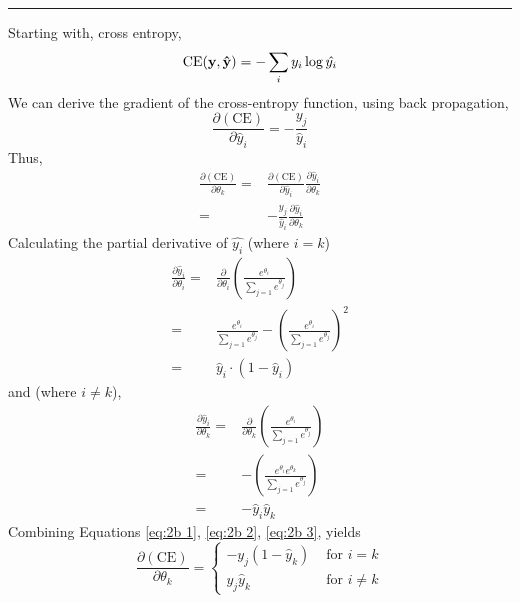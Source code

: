 \documentclass[letter,12pt]{article}
\begin{document}
\noindent\rule{\textwidth}{0.4pt}\vspace{5mm}
Starting with, cross entropy,
\begin{equation}
\textrm{CE}({\bf y},{\bf\hat{y}}) = -\sum_{i}{y_{i}\log{\hat{y_{i}}}}
\end{equation}
We can derive the gradient of the cross-entropy function, using back propagation, 
\begin{equation}
\frac{\partial(\textrm{CE})}{\partial{\hat{y}_{i}}} = -\frac{y_{j}}{\hat{y}_{i}}\label{eq:2b 1}
\end{equation}
Thus, 
\begin{align}
\frac{\partial(\textrm{CE})}{\partial{\theta_{k}}} = & \frac{\partial(\textrm{CE})}{\partial{\hat{y}_{i}}}\frac{\partial{\hat{y}_{i}}}{\partial{\theta_{k}}} \\
                                                                        = & -\frac{y_{j}}{\hat{y}_{i}}\frac{\partial{\hat{y}_{i}}}{\partial{\theta_{k}}}
\end{align}
Calculating the partial derivative of $\hat{y_{i}}$ (where $i=k$)
\begin{align}
\frac{\partial{\hat{y}_{i}}}{\partial{\theta_{i}}} = & \frac{\partial}{\partial{\theta_{i}}}\left( \frac{e^{\theta_{i}}}{\sum_{j=1}{e^{\theta_{j}}}}\right) \\
                                                                      = & \frac{e^{\theta_{i}}}{\sum_{j=1}{e^{\theta_{j}}}} - \left(\frac{e^{\theta_{i}}}{\sum_{j=1}{e^{\theta_{j}}}}\right)^{2} \\
                                                                      = & \hat{y}_{i}\cdot(1 - \hat{y}_{i})\label{eq:2b 2}
\end{align}
and (where $i\neq k$),
\begin{align}
\frac{\partial{\hat{y}_{i}}}{\partial{\theta_{k}}} = & \frac{\partial}{\partial{\theta_{k}}}\left( \frac{e^{\theta_{i}}}{\sum_{j=1}{e^{\theta_{j}}}}\right) \\
                                                                       = & - \left(\frac{e^{\theta_{i}}e^{\theta_{k}}}{\sum_{j=1}{e^{\theta_{j}}}}\right) \\
                                                                       = & - \hat{y}_{i}\hat{y}_{k}\label{eq:2b 3}
\end{align}
Combining Equations \ref{eq:2b 1}, \ref{eq:2b 2}, \ref{eq:2b 3}, yields 
\begin{equation}
\frac{\partial(\textrm{CE})}{\partial{\theta_{k}}} = \begin{cases}
-y_{j}(1 - \hat{y}_{k})&\text{ for }i=k \\
y_{j}\hat{y}_{k}&\text{ for }i\neq k
\end{cases}
\end{equation}
\end{document}
